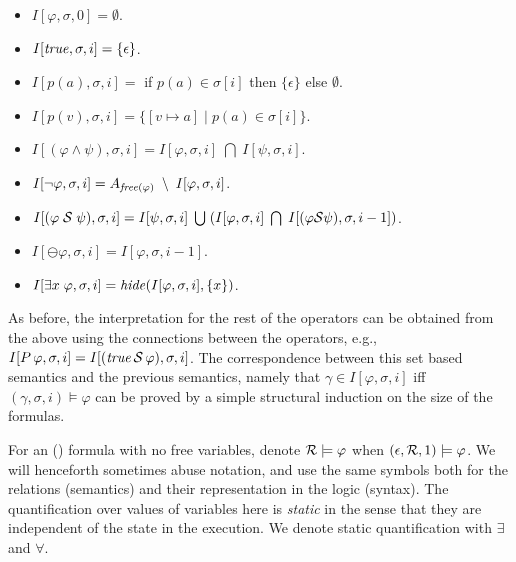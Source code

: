 \begin{itemize}
\item $I [ \varphi , \sigma , 0 ] = \emptyset$.
\item $I [ \mathit{true} , \sigma , i ] = \{ \epsilon \}$.
\item $I [ p ( a ) , \sigma , i ] =$ if $p ( a ) \in \sigma [ i ]$ then
$\{ \epsilon \}$ else $\emptyset$.
\item $I [ p ( v ) , \sigma , i ] = \{ [ v \mapsto a ] \; | \; p ( a ) \in
\sigma [ i ] \}$.
\item $I [ ( \varphi \wedge \psi ) , \sigma , i ] = 
I [ \varphi , \sigma , i ] \;  \bigcap \; I [ \psi , \sigma , i ]$.
\item $I [ \neg \varphi , \sigma , i ] = 
A_{\mathit{free} ( \varphi )} \; \setminus \; I [ \varphi , \sigma , i ]$.
\item $I [ ( \varphi \; {\cal S} \; \psi ) , \sigma , i ] = 
I [ \psi , \sigma , i ] \; \bigcup \;
( I [ \varphi , \sigma , i ] \; \bigcap \; 
I [ (\varphi {\cal S} \psi ) , \sigma , i - 1 ] )$.
\item $I [ \ominus \varphi , \sigma , i ] = I [ \varphi , \sigma , i-1 ]$.
\item $I [ \exists x \; \varphi , \sigma , i ] = 
\mathit{hide} ( I [ \varphi , \sigma , i ] , \{ x \} )$.
\end{itemize}

\noindent
As before, the interpretation for the rest of the operators can
be obtained from the above using the connections between the operators,
e.g., $I [ P \, \varphi  , \sigma , i ] = 
I [ ( \mathit{true} \, {\cal S} \, \varphi ) , \sigma , i ]$.
The correspondence between this set based semantics 
and the previous semantics, namely that
$\gamma \in I [ \varphi , \sigma, i ]$ iff
$( \gamma , \sigma , i ) \models \varphi$
can be proved by a simple structural induction on
the size of the formulas.
 \fi

For an \FLTL{} (\PFLTL{}) formula with no free variables, denote ${\cal R} \models \varphi$ when $( \epsilon , {\cal R} , 1 ) \models \varphi$.
We will henceforth sometimes abuse notation, and use the same
symbols both for the relations (semantics) and their representation in
the logic (syntax).
The quantification over values of variables here is {\em static} in the sense that they are independent of the state in the execution. We
denote static quantification with $\exists$ and
$\forall$.


